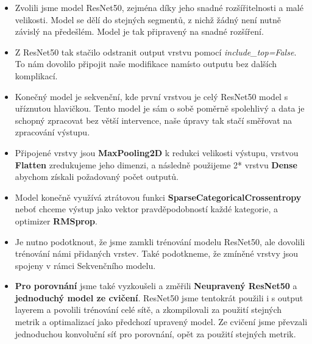 \documentclass[a4paper]{article}
\newenvironment{ukol}[2][]{\begin{trivlist} 
\item[\hskip \labelsep {\bfseries #1}\hskip \labelsep {\bfseries #2}]}{\end{trivlist}}
\begin{document}
\begin{ukol}{Modely}
\begin{itemize}
	\item Zvolili jsme model ResNet50, zejména díky jeho snadné rozšířitelnosti a malé velikosti. Model se dělí do stejných segmentů, z nichž žádný není nutně závislý na předešlém. Model je tak připravený na snadné rozšíření.
	\item Z ResNet50 tak stačilo odstranit output vrstvu pomocí \textit{include\_top=False}. To nám dovolilo připojit naše modifikace namísto outputu bez dalších komplikací.
	\item Konečný model je sekvenční, kde první vrstvou je celý ResNet50 model s uříznutou hlavičkou. Tento model je sám o sobě poměrně spolehlivý a data je schopný zpracovat bez větší intervence, naše úpravy tak stačí směřovat na zpracování výstupu.
	\item Připojené vrstvy jsou \textbf{MaxPooling2D} k redukci velikosti výstupu, vrstvou \textbf{Flatten} zredukujeme jeho dimenzi, a následně použijeme 2* vrstvu \textbf{Dense} abychom získali požadovaný počet outputů.
	\item Model konečně využívá ztrátovou funkci \textbf{SparseCategoricalCrossentropy} neboť chceme výstup jako vektor pravděpodobností každé kategorie, a optimizer \textbf{RMSprop}.
	\item Je nutno podotknout, že jsme zamkli trénování modelu ResNet50, ale dovolili trénování námi přidaných vrstev. Také podotkneme, že zmíněné vrstvy jsou spojeny v rámci Sekvenčního modelu.
	\item \textbf{Pro porovnání} jsme také vyzkoušeli a změřili \textbf{Neupravený ResNet50} a \textbf{jednoduchý model ze cvičení}. ResNet50 jsme tentokrát použili i s output layerem a povolili trénování celé sítě, a zkompilovali za použití stejných metrik a optimalizací jako předchozí upravený model. Ze cvičení jsme převzali jednoduchou konvoluční síť pro porovnání, opět za použití stejných metrik.
\end{itemize}

\end{ukol}
\end{document}
